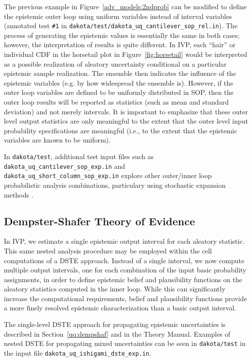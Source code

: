 The previous example in Figure~\ref{adv_models:2ndprob} can be
modified to define the epistemic outer loop using uniform variables
instead of interval variables (annotated test \texttt{\#1} in
\texttt{dakota/test/dakota\_uq\_cantilever\_sop\_rel.in}).  The process of
generating the epistemic values is essentially the same in both cases;
however, the interpretation of results is quite different.  In IVP,
each ``hair'' or individual CDF in the horsetail plot in
Figure~\ref{fig:horsetail} would be interpreted as a possible
realization of aleatory uncertainty conditional on a particular
epistemic sample realization.  The ensemble then indicates the
influence of the epistemic variables (e.g. by how widespread the
ensemble is).  However, if the outer loop variables are defined to be
uniformly distributed in SOP, then the outer loop results will be
reported as statistics (such as mean and standard deviation) and not
merely intervals.  It is important to emphasize that these outer level
output statistics are only meaningful to the extent that the outer
level input probability specifications are meaningful (i.e., to the
extent that the epistemic variables are known to be uniform).

In \texttt{dakota/test}, additional test input files such as
\texttt{dakota\_uq\_cantilever\_sop\_exp.in} and\\
\texttt{dakota\_uq\_short\_column\_sop\_exp.in} explore other outer/inner
loop probabilistic analysis combinations, particulary using stochastic
expansion methods .

\subsection{Dempster-Shafer Theory of Evidence} \label{adv_models:mixed_uq:dste}

In IVP, we estimate a single epistemic output interval for each
aleatory statistic.  This same nested analysis procedure may be
employed within the cell computations of a DSTE approach.  Instead of
a single interval, we now compute multiple output intervals, one for
each combination of the input basic probability assignments, in order
to define epistemic belief and plausibility functions on the aleatory
statistics computed in the inner loop.  While this can significantly
increase the computational requirements, belief and plausibility
functions provide a more finely resolved epistemic characterization
than a basic output interval.

The single-level DSTE approach for propagating epistemic uncertainties
is described in Section~\ref{uq:dempshaf} and in the Theory Manual.
Examples of nested DSTE for propagating mixed uncertainties can be
seen in \texttt{dakota/test} in the input file
\texttt{dakota\_uq\_ishigami\_dste\_exp.in}.


